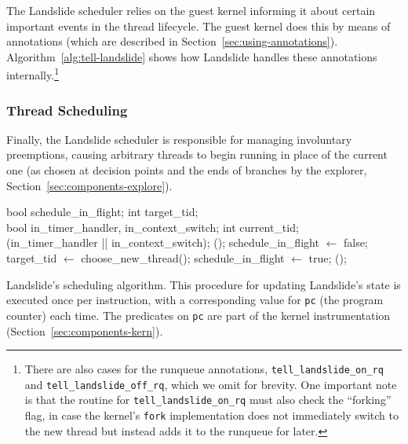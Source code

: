 The Landslide scheduler relies on the guest kernel informing it about certain important events in the thread lifecycle. The guest kernel does this by means of annotations (which are described in Section~\ref{sec:using-annotations}). Algorithm~\ref{alg:tell-landslide} shows how Landslide handles these annotations internally.\footnote{
There are also cases for the runqueue annotations, \texttt{tell\_landslide\_on\_rq} and \texttt{tell\_landslide\_off\_rq}, which we omit for brevity. One important note is that the routine for \texttt{tell\_landslide\_on\_rq} must also check the ``forking'' flag, in case the kernel's \texttt{fork} implementation does not immediately switch to the new thread but instead adds it to the runqueue for later.}

\subsubsection{Thread Scheduling}
\label{sec:components-inflight}

Finally, the Landslide scheduler is responsible for managing involuntary preemptions, causing arbitrary threads to begin running in place of the current one (as chosen at decision points and the ends of branches by the explorer, Section~\ref{sec:components-explore}).

\begin{algorithm}[t]
	\footnotesize
	\begin{algorithmic}
		\State bool schedule\_in\_flight;
		\State int target\_tid;
		\\
		\State bool in\_timer\_handler, in\_context\_switch;
		\State int current\_tid;
		\\
				(in\_timer\_handler || in\_context\_switch);
						();
					\Else
						\State schedule\_in\_flight $\gets$ false;
					\EndIf
				\EndIf
				\State target\_tid $\gets$ {\sc choose\_new\_thread}();
				\State schedule\_in\_flight $\gets$ true;
				();
			\EndIf
		\EndFunction
	\end{algorithmic}
	\caption{Landslide's scheduling algorithm. This procedure for updating Landslide's state is executed once per instruction, with a corresponding value for \texttt{pc} (the program counter) each time. The predicates on \texttt{pc} are part of the kernel instrumentation (Section~\ref{sec:components-kern}).}
	\label{alg:inflight}
\end{algorithm}


